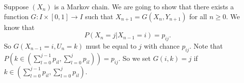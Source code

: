 
\beginproof
Suppose $(X_n)$ is a Markov chain. We are going to show that there exists a function $G: I \times [0,1] \to I$ such that $X_{n+1}=G(X_n,Y_{n+1})$ for all $n\geq 0$. We know that 
\[P(X_{n}=j | X_{n-1} =i) = p_{ij}. \]
So $G(X_{n-1}=i,U_n = k)$ must be equal to $j$ with chance $p_{ij}$. Note that $P(k \in (\sum_{l=0}^{j-1} p_{il}, \sum_{l=0}^j p_{il}))=p_{ij}$. So we set $G(i,k)=j$ if $k \in (\sum_{l=0}^{j-1} p_{il}, \sum_{l=0}^j p_{il})$. 
\endproof